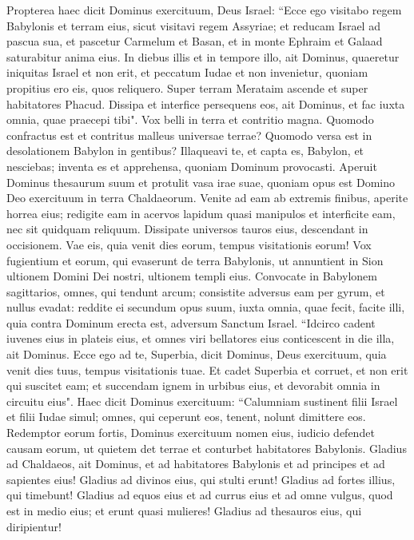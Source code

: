 \begin{biblechapter}
\verse Propterea haec dicit Dominus exercituum, Deus Israel: “Ecce ego visitabo regem Babylonis et terram eius, sicut visitavi regem Assyriae; 
\verse et reducam Israel ad pascua sua, et pascetur Carmelum et Basan, et in monte Ephraim et Galaad saturabitur anima eius. 
\verse In diebus illis et in tempore illo, ait Dominus, quaeretur iniquitas Israel et non erit, et peccatum Iudae et non invenietur, quoniam propitius ero eis, quos reliquero. 
\verse Super terram Merataim ascende et super habitatores Phacud. Dissipa et interfice persequens eos, ait Dominus, et fac iuxta omnia, quae praecepi tibi". 
\verse Vox belli in terra et contritio magna. 
\verse Quomodo confractus est et contritus malleus universae terrae? Quomodo versa est in desolationem Babylon in gentibus? 
\verse Illaqueavi te, et capta es, Babylon, et nesciebas; inventa es et apprehensa, quoniam Dominum provocasti. 
\verse Aperuit Dominus thesaurum suum et protulit vasa irae suae, quoniam opus est Domino Deo exercituum in terra Chaldaeorum. 
\verse Venite ad eam ab extremis finibus, aperite horrea eius; redigite eam in acervos lapidum quasi manipulos et interficite eam, nec sit quidquam reliquum. 
\verse Dissipate universos tauros eius, descendant in occisionem. Vae eis, quia venit dies eorum, tempus visitationis eorum! 
\verse Vox fugientium et eorum, qui evaserunt de terra Babylonis, ut annuntient in Sion ultionem Domini Dei nostri, ultionem templi eius. 
\verse Convocate in Babylonem sagittarios, omnes, qui tendunt arcum; consistite adversus eam per gyrum, et nullus evadat: reddite ei secundum opus suum, iuxta omnia, quae fecit, facite illi, quia contra Dominum erecta est, adversum Sanctum Israel. 
\verse “Idcirco cadent iuvenes eius in plateis eius, et omnes viri bellatores eius conticescent in die illa, ait Dominus. 
\verse Ecce ego ad te, Superbia, dicit Dominus, Deus exercituum, quia venit dies tuus, tempus visitationis tuae. 
\verse Et cadet Superbia et corruet, et non erit qui suscitet eam; et succendam ignem in urbibus eius, et devorabit omnia in circuitu eius". 
\verse Haec dicit Dominus exercituum: “Calumniam sustinent filii Israel et filii Iudae simul; omnes, qui ceperunt eos, tenent, nolunt dimittere eos. 
\verse Redemptor eorum fortis, Dominus exercituum nomen eius, iudicio defendet causam eorum, ut quietem det terrae et conturbet habitatores Babylonis. 
\verse Gladius ad Chaldaeos, ait Dominus, et ad habitatores Babylonis et ad principes et ad sapientes eius! 
\verse Gladius ad divinos eius, qui stulti erunt! Gladius ad fortes illius, qui timebunt! 
\verse Gladius ad equos eius et ad currus eius et ad omne vulgus, quod est in medio eius; et erunt quasi mulieres! Gladius ad thesauros eius, qui diripientur! 

\end{biblechapter}
